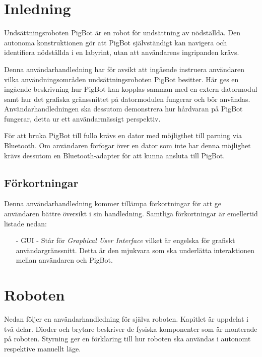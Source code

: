 \documentclass[11pt]{article}
\begin{document}
\pagebreak
{}

\section{Inledning}
Undsättningsroboten PigBot är en robot för undsättning av nödställda. Den autonoma konstruktionen gör att PigBot självständigt kan navigera och identifiera nödställda i en labyrint, utan att användarens ingripanden krävs.

Denna användarhandledning har för avsikt att ingående instruera användaren vilka användningsområden undsättningsroboten PigBot besitter. Här ges en ingående beskrivning hur PigBot kan kopplas samman med en extern datormodul samt hur det grafiska gränssnittet på datormodulen fungerar och bör användas. Användarhandledningen ska dessutom demonstrera hur hårdvaran på PigBot fungerar, detta ur ett användarmässigt perspektiv. 

För att bruka PigBot till fullo krävs en dator med möjligthet till parning via Bluetooth\textsuperscript{\circledR}. Om användaren förfogar över en dator som inte har denna möjlighet krävs dessutom en Bluetooth\textsuperscript{\circledR}-adapter för att kunna ansluta till PigBot.

\subsection{Förkortningar}
Denna användarhandledning kommer tillämpa förkortningar för att ge användaren bättre översikt i sin handledning. Samtliga förkortningar är emellertid listade nedan:

\begin{itemize}
  \item[-] GUI - Står för \textit{Graphical User Interface} vilket är engelska för grafiskt användargränssnitt. Detta är den mjukvara som ska underlätta interaktionen mellan användaren och PigBot.
\end{itemize}

\pagebreak

\section{Roboten}
Nedan följer en användarhandledning för själva roboten. Kapitlet är uppdelat i två delar. Dioder och brytare beskriver de fysiska komponenter som är monterade på roboten. Styrning ger en förklaring till hur roboten ska användas i autonomt respektive manuellt läge.
\end{document}
